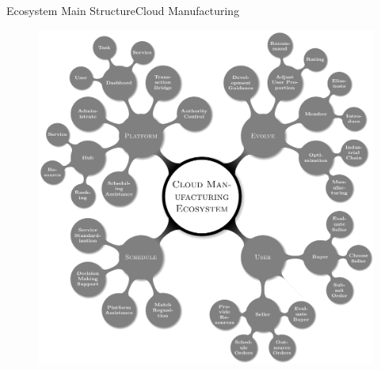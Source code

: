 \begin{frame}{Ecosystem Main Structure}{Cloud Manufacturing}
{\begin{figure}
	\includegraphics[height=0.82\textheight,viewport=40 0 500 250,clip=true]{figures/platformstruct.pdf}
	\end{figure}
}
\fi
\end{frame}

